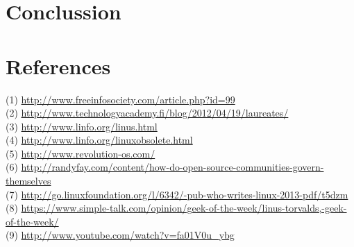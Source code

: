 \documentclass[11pt]{article}
\begin{document}
\section{Conclussion}

\section{References}
(1) \url{http://www.freeinfosociety.com/article.php?id=99}
\\
(2) \url{http://www.technologyacademy.fi/blog/2012/04/19/laureates/}
\\
(3) \url{http://www.linfo.org/linus.html}
\\
(4) \url{http://www.linfo.org/linuxobsolete.html}
\\
(5) \url{http://www.revolution-os.com/}
\\
(6) \url{http://randyfay.com/content/how-do-open-source-communities-govern-themselves}
\\
(7) \url{http://go.linuxfoundation.org/l/6342/-pub-who-writes-linux-2013-pdf/t5dzm}
\\
(8) \url{https://www.simple-talk.com/opinion/geek-of-the-week/linus-torvalds,-geek-of-the-week/}
\\
(9) \url{http://www.youtube.com/watch?v=fa01V0u_ybg}
\end{document}
